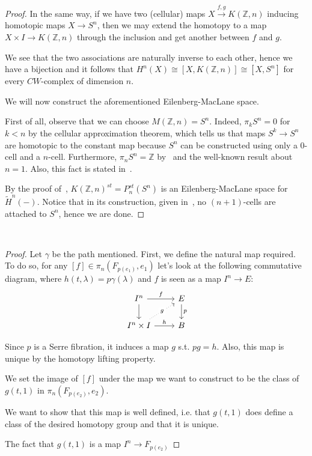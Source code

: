 \documentclass{article}
\newcommand{\numberset}{\mathbb}
\newcommand{\Z}{\numberset{Z}}
\newcommand{\exercise}[1]{\noindent {\bf Exercise #1}}
\begin{document}
\begin{proof}
    In the same way, if we have two (cellular) maps $X\xrightarrow{f,g} K(\Z,n)$
    inducing homotopic maps $X\rightarrow S^n$, then we may extend the homotopy
    to a map $X\times I\rightarrow K(\Z,n)$ through the inclusion and get
    another between $f$ and $g$.

    We see that the two associations are naturally inverse to each other, hence
    we have a bijection and it follows that $H^n(X)\cong[X,K(\Z,n)]\cong[X,S^n]$
    for every $CW$-complex of dimension $n$.

    We will now construct the aforementioned Eilenberg-MacLane space.

    First of all, observe that we can choose $M(\Z,n)=S^n$. Indeed, $\pi_kS^n=0$
    for $k<n$ by the cellular approximation theorem, which tells us that maps
    $S^k\rightarrow S^n$ are homotopic to the constant map because $S^n$ can be
    constructed using only a 0-cell and a $n$-cell. Furthermore, $\pi_nS^n=\Z$
    by~\cite[cor. 15.7]{Sag17} and the well-known result about $n=1$. Also, this
    fact is stated in~\cite[ex. 8.8]{HM19}.

    By the proof of~\cite[thm. 8.9]{HM19}, $K(\Z,n)^{st}=P_n^{st}(S^n)$ is an
    Eilenberg-MacLane space for $\tilde{H}^n(-)$. Notice that in its
    construction, given in~\cite[lemmaa 8.4]{HM19}, no $(n+1)$-cells are
    attached to $S^n$, hence we are done.
\end{proof}


~\\
\exercise{4}

\begin{proof}
    Let $\gamma$ be the path mentioned. First, we define the natural map
    required. To do so, for any $[f]\in\pi_n(F_{p(e_1)},e_1)$ let's look at the
    following commutative diagram, where $h(t,\lambda)=p\gamma(\lambda)$ and $f$
    is seen as a map $I^n\rightarrow E$:
    \[
        \begin{tikzcd}
            I^n\arrow{r}{f}\arrow{d}
            & E\arrow{d}{p} \\
            I^n\times I\arrow[dotted]{ur}[description]{g}\arrow{r}{h}
            & B
        \end{tikzcd}
    \]

    Since $p$ is a Serre fibration, it induces a map $g$ s.t. $pg=h$. Also, this
    map is unique by the homotopy lifting property.

    We set the image of $[f]$ under the map we want to construct to be the class
    of $g(t,1)$ in $\pi_n(F_{p(e_2)},e_2)$.

    We want to show that this map is well defined, i.e. that $g(t,1)$ does
    define a class of the desired homotopy group and that it is unique.

    The fact that $g(t,1)$ is a map $I^n\rightarrow F_{p(e_2)}$
\end{proof}



\printbibliography
\end{document}
